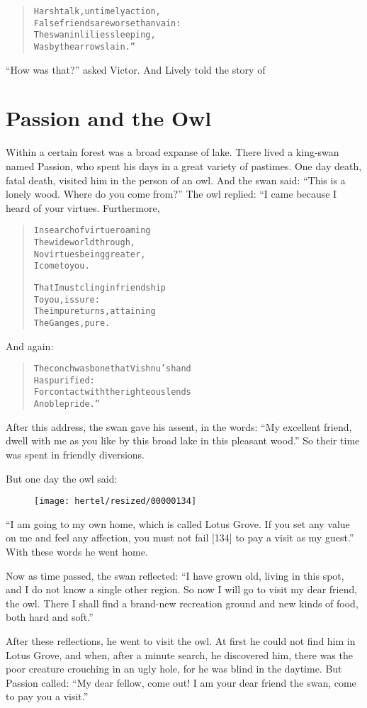 \documentclass[article, twoside, 10pt]{memoir}
\renewenvironment{verbatim}{%
\begin{quote}%
\vskip -10pt%
\begin{alltt}\normalfont\small}{\end{alltt}%
\end{quote}%
\vskip -10pt
} %
\begin{document}
\begin{verbatim}
Harsh talk, untimely action,
    False friends{\textemdash}are worse than vain:
The swan in lilies sleeping,
    Was by the arrow slain.”
\end{verbatim}
``How was that?'' asked Victor. And Lively told the story of

\chapter{Passion and the Owl}

Within a certain forest was a broad expanse of lake. There lived a
king-swan named Passion, who spent his days in a great variety of
pastimes. One day death, fatal death, visited him in the person of
an owl. And the swan said:
``This is a lonely wood. Where do you come from?'' The owl replied:
“I came because I heard of your virtues. Furthermore,

\begin{verbatim}
In search of virtue roaming
    The wide world through,
No virtues being greater,
    I come to you.

That I must cling in friendship
    To you, is sure:
The impure turns, attaining
    The Ganges, pure.
\end{verbatim}
And again:

\begin{verbatim}
The conch was bone that Vishnu's hand
    Has purified:
For contact with the righteous lends
    A noble pride.”
\end{verbatim}
After this address, the swan gave his assent, in the words:
``My excellent friend, dwell with me as you like by this broad lake in this pleasant wood.''
So their time was spent in friendly diversions.

But one day the owl said:
\begin{figure}[p]\texttt{[image: hertel/resized/00000134]}\end{figure}``I am going to my own home, which is called Lotus Grove. If you set any value on me and feel any affection, you must not fail [134] to pay a visit as my guest.''
With these words he went home.

Now as time passed, the swan reflected:
``I have grown old, living in this spot, and I do not know a single other region. So now I will go to visit my dear friend, the owl. There I shall find a brand-new recreation ground and new kinds of food, both hard and soft.''

After these reflections, he went to visit the owl. At first he
could not find him in Lotus Grove, and when, after a minute search,
he discovered him, there was the poor creature crouching in an ugly
hole, for he was blind in the daytime. But Passion called:
``My dear fellow, come out! I am your dear friend the swan, come to pay you a visit.''
\end{document}
